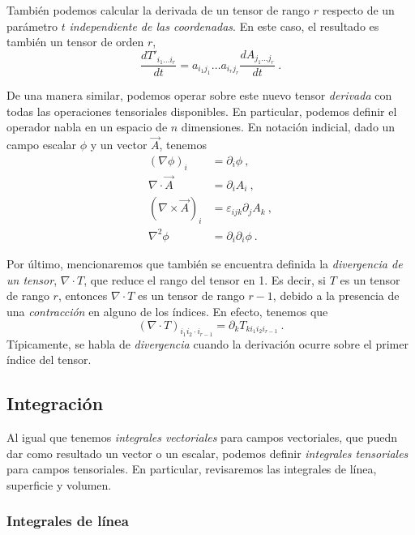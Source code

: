 También podemos calcular la derivada de un tensor de rango $r$ respecto de un parámetro $t$ \emph{independiente de las coordenadas}. En este caso, el resultado es también un tensor de orden $r$,
\begin{equation}
    \frac{d T'_{i_1 \dots i_r}}{dt} = a_{i_1 j_1} \dots a_{i_r j_r} \frac{dA_{j_1 \dots j_r}}{dt} \ . 
\end{equation}

De una manera similar, podemos operar sobre este nuevo tensor \emph{derivada} con todas las operaciones tensoriales disponibles. En particular, podemos definir el operador nabla en un espacio de $n$ dimensiones. En notación indicial, dado un campo escalar $\phi$ y un vector $\vec{A}$, tenemos
\begin{align}
    (\nabla \phi)_i & = \partial_i \phi \ , \\
    \nabla \cdot \vec{A} & = \partial_i A_i \ , \\
    (\nabla \times \vec{A})_i & = \varepsilon_{ijk} \partial_j A_k \ , \\
    \nabla^2 \phi & = \partial_i \partial_i \phi \ .
\end{align}

Por último, mencionaremos que también se encuentra definida la \emph{divergencia de un tensor}, $\nabla \cdot T$, que reduce el rango del tensor en 1. Es decir, si $T$ es un tensor de rango $r$, entonces $\nabla \cdot T$ es un tensor de rango $r-1$, debido a la presencia de una \emph{contracción} en alguno de los índices. En efecto, tenemos que
\begin{equation*}
    (\nabla \cdot T)_{i_1 i_2 \cdot i_{r-1}} = \partial_k T_{k i_1 i_2 i_{r-1}} \ .
\end{equation*}
Típicamente, se habla de \emph{divergencia} cuando la derivación ocurre sobre el primer índice del tensor.


\subsection{Integración}

Al igual que tenemos \emph{integrales vectoriales} para campos vectoriales, que puedn dar como resultado un vector o un escalar, podemos definir \emph{integrales tensoriales} para campos tensoriales. En particular, revisaremos las integrales de línea, superficie y volumen.

\subsubsection*{Integrales de línea}

